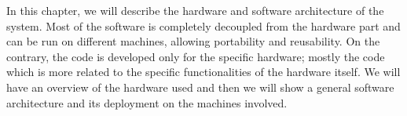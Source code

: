 In this chapter, we will describe the hardware and software architecture of the system.
Most of the software is completely decoupled from the hardware part and can be run
on different machines, allowing portability and reusability. On the contrary, the
code is developed only for the specific hardware; mostly the code which is more related
to the specific functionalities of the hardware itself. We will have an overview of the hardware
used and then we will show a general software architecture and its deployment on the
machines involved.




